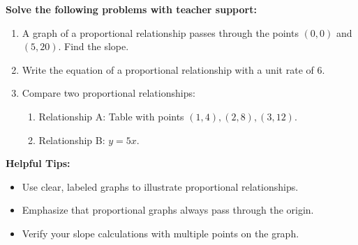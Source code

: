 \documentclass[12pt]{article}
\begin{document}
\begin{tcolorbox}[colframe=black!60, colback=white, 
coltitle=black, colbacktitle=black!15, fonttitle=\bfseries\Large, 
title=Guided Practice, halign title=center, left=10pt, right=10pt, top=10pt, bottom=15pt]
\textbf{Solve the following problems with teacher support:}
\begin{enumerate}[itemsep=5em]
    \item A graph of a proportional relationship passes through the points \((0, 0)\) and \((5, 20)\). Find the slope.
    \item Write the equation of a proportional relationship with a unit rate of \(6\).
    \item Compare two proportional relationships:
    \begin{enumerate}
        \item Relationship A: Table with points \((1, 4), (2, 8), (3, 12)\).
        \item Relationship B: \(y = 5x\).
    \end{enumerate}
\end{enumerate}
\end{tcolorbox}

\vspace{1em}

\begin{tcolorbox}[colframe=black!40, colback=gray!5, 
coltitle=black, colbacktitle=black!20, fonttitle=\bfseries\Large, 
title=Additional Notes, halign title=center, left=5pt, right=5pt, top=5pt, bottom=15pt]
\textbf{Helpful Tips:}
\begin{itemize}
    \item Use clear, labeled graphs to illustrate proportional relationships.
    \item Emphasize that proportional graphs always pass through the origin.
    \item Verify your slope calculations with multiple points on the graph.
\end{itemize}
\end{tcolorbox}

\vspace{1em}
\end{document}
